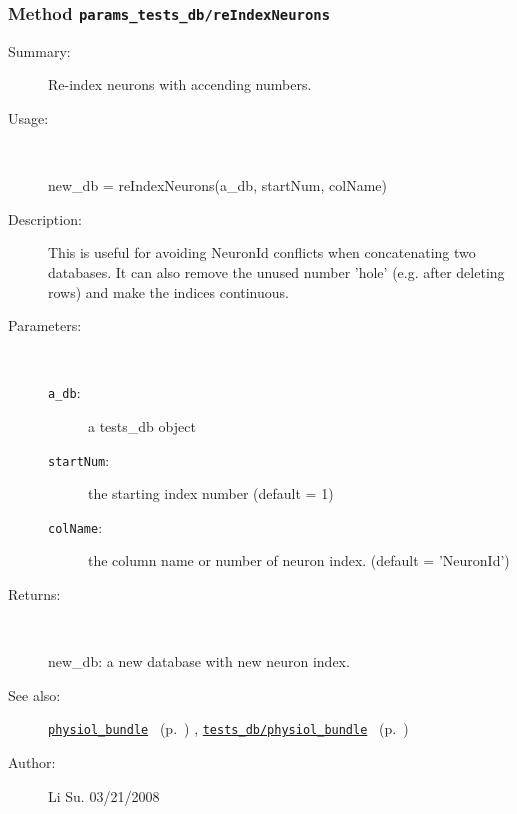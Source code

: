 \subsubsection[Method \texttt{reIndexNeurons}]{Method \texttt{params\_tests\_db/reIndexNeurons}}%
%
\label{ref_params_tests_db__reIndexNeurons}%
\hypertarget{ref_params_tests_db__reIndexNeurons}{}%
\begin{description}
\item[Summary:]Re-index neurons with accending numbers. 
%
\item[Usage:]~%
\begin{lyxcode}%
new\_db = reIndexNeurons(a\_db, startNum, colName)
%
\end{lyxcode}%
%
\item[Description:]%
This is useful for avoiding NeuronId conflicts when concatenating two
 databases. It can also remove the unused number 'hole' (e.g. after
 deleting rows) and make the indices continuous.
\item[Parameters:]~
\begin{description}%
\item[\texttt{a\_db}:]
 a tests\_db object
\item[\texttt{startNum}:]
 the starting index number (default = 1)
\item[\texttt{colName}:]
 the column name or number of neuron index. (default = 'NeuronId')
\end{description}%
%
\item[Returns:
]~

   new\_db: a new database with new neuron index.
%
%
\item[See also:]%
\hyperlink{ref_physiol_bundle}{\texttt{physiol\_bundle}}%
\ (p.~\pageref{ref_physiol_bundle})%
%
, \hyperlink{ref_tests_db__physiol_bundle}{\texttt{tests\_db/physiol\_bundle}}%
\ (p.~\pageref{ref_tests_db__physiol_bundle})%
%
%
\item[Author:]%
Li Su. 03/21/2008
%
\end{description}
\methodline%
